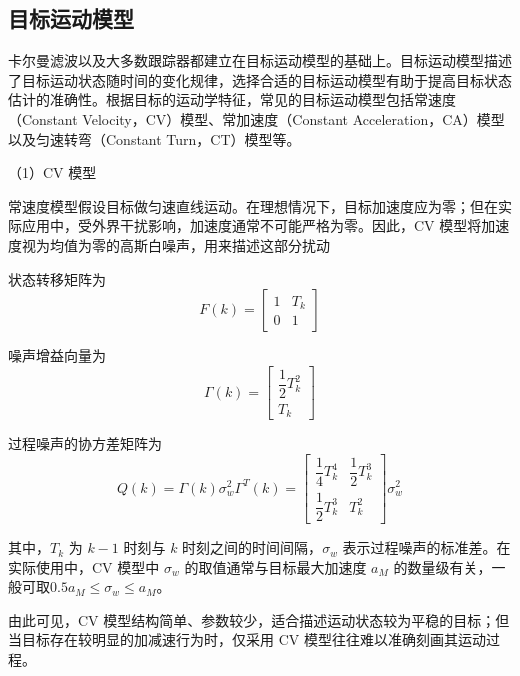 \documentclass{xdupgthesis}
\begin{document}
\subsection{目标运动模型}

卡尔曼滤波以及大多数跟踪器都建立在目标运动模型的基础上。目标运动模型描述了目标运动状态随时间的变化规律，选择合适的目标运动模型有助于提高目标状态估计的准确性。根据目标的运动学特征，常见的目标运动模型包括常速度（Constant Velocity，CV）模型、常加速度（Constant Acceleration，CA）模型以及匀速转弯（Constant Turn，CT）模型等。


\textnormal{（1）CV 模型}\par\vspace{0.3\baselineskip}

常速度模型假设目标做匀速直线运动。在理想情况下，目标加速度应为零；但在实际应用中，受外界干扰影响，加速度通常不可能严格为零。因此，CV 模型将加速度视为均值为零的高斯白噪声，用来描述这部分扰动

状态转移矩阵为
\begin{equation}
	F(k)=
	\begin{bmatrix}
		1 & T_k\\
		0 & 1
	\end{bmatrix}
\end{equation}

噪声增益向量为
\begin{equation}
	\Gamma(k)=
	\begin{bmatrix}
		\dfrac{1}{2}T_k^2\\
		T_k
	\end{bmatrix}
\end{equation}

过程噪声的协方差矩阵为
\begin{equation}
	Q(k)=\Gamma(k)\sigma_w^2\Gamma^{T}(k)=
	\begin{bmatrix}
		\dfrac{1}{4}T_k^4 & \dfrac{1}{2}T_k^3\\[6pt]
		\dfrac{1}{2}T_k^3 & T_k^2
	\end{bmatrix}\sigma_w^2
\end{equation}

其中，$T_k$ 为 $k-1$ 时刻与 $k$ 时刻之间的时间间隔，$\sigma_w$ 表示过程噪声的标准差。在实际使用中，CV 模型中 $\sigma_w$ 的取值通常与目标最大加速度 $a_M$ 的数量级有关，一般可取\(0.5a_M \leq \sigma_w \leq a_M\)\cite{barshalom2004estimation}。


由此可见，CV 模型结构简单、参数较少，适合描述运动状态较为平稳的目标；但当目标存在较明显的加减速行为时，仅采用 CV 模型往往难以准确刻画其运动过程。
\end{document}
